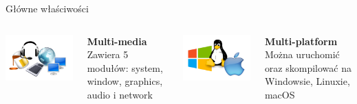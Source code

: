 \documentclass[12pt]{beamer}
\begin{document}
    \begin{frame}[t]{Główne właściwości}\vspace{2pt}

        \begin{columns}
            
            \includegraphics[scale=0.3]{textures/multimedia.png} \\[20pt]
            \begin{center}
                \textbf{Multi-media} \\
                Zawiera 5 modułów: system, window, graphics, audio i network
            \end{center}
            

            \includegraphics[scale=0.3]{textures/multiplatform.png} \\[20pt]
            \begin{center}
                \textbf{Multi-platform} \\
                Można uruchomić oraz skompilować na Windowsie, Linuxie, macOS
            \end{center}


\end{columns}
\end{frame}
\end{document}
